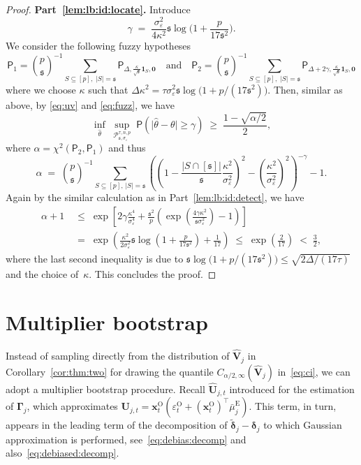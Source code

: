 \documentclass[11pt, a4paper]{article}
\newcommand{\mbf}{\mathbf}
\newcommand{\mc}{\mathcal}
\newcommand{\vep}{\varepsilon}
\renewcommand{\l}{\left}
\renewcommand{\r}{\right}
\def\wh{\widehat}
\def\wc{\widetilde}
\newcommand{\p}{\mathsf{P}}
\newcommand{\tE}{\text{E}}
\newcommand{\tO}{\text{O}}
\theoremstyle{definition}
\theoremstyle{definition}
\theoremstyle{definition}
\theoremstyle{definition}
\theoremstyle{definition}
\theoremstyle{remark}
\theoremstyle{definition}
\theoremstyle{definition}
\theoremstyle{definition}
\begin{document}
\begin{proof}
{\bf Part~\ref{lem:lb:id:locate}.} Introduce 
\[
\gamma \;= \;\frac{\sigma_{\vep}^2}{4\kappa^2}\mathfrak{s} \log\bigl(1 + \frac{p}{17\mathfrak{s}^2}\bigr).
\]
We consider the following fuzzy hypotheses 
\[
\p_1 = {p \choose \mathfrak{s}}^{-1} \sum_{S\subseteq [p],\; \vert S \vert = \mathfrak{s}}\p_{\Delta, \frac{\kappa}{\sqrt{\mathfrak{s}}}\mathbf{1}_S, \bm 0}\quad\text{and}\quad
\p_2 = {p \choose \mathfrak{s}}^{-1} \sum_{S\subseteq [p],\; \vert S \vert = \mathfrak{s}}\p_{\Delta+2\gamma, \frac{\kappa}{\sqrt{\mathfrak{s}}}\mathbf{1}_S, \bm 0}
\]
where we choose $\kappa$ such that $\Delta\kappa^2 = \tau \sigma_{\vep}^2\mathfrak{s} \log\bigl(1 + {p}/({17\mathfrak{s}^2})\bigr)$. Then, similar as above, by \eqref{eq:uv} and \eqref{eq:fuzz}, we have
\[
\inf_{\wh\theta}\; \sup_{\mc P_{\mathfrak{s}, \sigma_{\vep}}^{\tau, n, p}} \;\p\l(\bigl\vert\wh\theta -\theta\bigr\vert \ge \gamma\r)\;
\ge\;\frac{1-\sqrt{\alpha/2}}{2},
\]
where $\alpha = \chi^2(\p_{2},\p_{1})$ and thus 
\[
\alpha \; =\; {p \choose \mathfrak{s}}^{-1}\sum_{S \subseteq [p],\, \vert S\vert = \mathfrak{s}} \l(\l(1-\frac{\vert S \cap [\mathfrak{s}] \vert}{\mathfrak{s}}\frac{\kappa^2}{\sigma_{\vep}^2}\r)^2 - \l(\frac{\kappa^2}{\sigma_{\vep}^2}\r)^2\r)^{-\gamma} - 1.
\]
Again by the similar calculation as in Part~\ref{lem:lb:id:detect}, we have
\begin{align*}
 \alpha + 1 \;&  \le \; \exp\l[2\gamma \frac{\kappa^4}{\sigma_{\vep}^4} + \frac{\mathfrak{s}^2}{p}\l(\exp\l(\frac{4\gamma\kappa^2}{\mathfrak{s}\sigma^2_{\vep}}\r) - 1\r)\r] \\
 & = \; \exp\l(\frac{\kappa^2}{2\sigma_{\vep}^2}\mathfrak{s}\log\l(1 + \frac{p}{17\mathfrak{s}^2}\r) + \frac{1}{17}\r)\; \le \; \exp\l(\frac{2}{17}\r) \; < \; \frac{3}{2},
\end{align*}
where the last second inequality is due to $\mathfrak{s}\log\bigl(1 + {p}/({17\mathfrak{s}^2})\bigr) \le \sqrt{{2\Delta}/({17\tau})}$ and the choice of~$\kappa$. This concludes the proof. 
\end{proof}


\section{Multiplier bootstrap}
\label{sec:boot}

Instead of sampling directly from the distribution of $\wh{\mbf V}_j$ in Corollary~\ref{cor:thm:two} for drawing the quantile $C_{\alpha/2, \infty}(\wh{\mbf V}_j)$ in~\eqref{eq:ci}, we can adopt a multiplier bootstrap procedure.
Recall $\wh{\mbf U}_{j, t}$ introduced for the estimation of $\bm\Gamma_j$, which approximates $\mbf U_{j, t} = \mbf x^{\tO}_t (\vep^{\tO}_t + (\mbf x^{\tO}_t)^\top \bar{\mu}^{\tE}_j)$.
This term, in turn, appears in the leading term of the decomposition of $\wc{\bm\delta}_j - \bm\delta_j$ to which Gaussian approximation is performed, see~\eqref{eq:debias:decomp} and also~\eqref{eq:debiased:decomp}.
\end{document}
